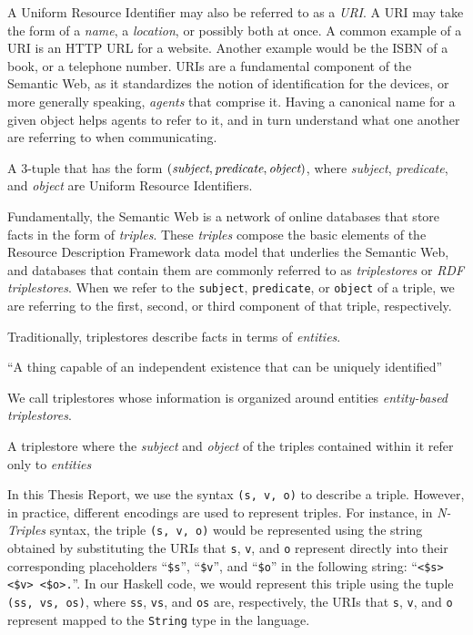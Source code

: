 \documentclass[../main.tex]{subfiles}
\begin{document}
A Uniform Resource Identifier may also be referred to as a {\em URI}.  A URI may take the form of a {\em name}, a {\em location}, or possibly both at once.
A common example of a URI is an HTTP URL for a website.  Another example would be the ISBN of a book, or a telephone number.
URIs are a fundamental component of the Semantic Web, as it standardizes the notion of identification for the devices, or more generally speaking, {\em agents}
that comprise it.  Having a canonical name for a given object helps agents to refer to it, and in turn understand what one another are referring to when communicating.

\begin{definition}[Triple]
	A 3-tuple that has the form $(\text{\em subject}, \text{\em predicate}, \text{\em object})$, where {\em subject}, {\em predicate}, and {\em object} are Uniform Resource Identifiers\cite{w3csemanticweb}.
\end{definition}

Fundamentally, the Semantic Web is a network of online databases that store facts in the form of {\em triples}.
These {\em triples} compose the basic elements of the Resource Description Framework data model that underlies the Semantic Web, and databases that contain them are commonly referred to as {\em triplestores} or {\em RDF triplestores}.  When we refer to the \texttt{subject}, \texttt{predicate}, or \texttt{object} of a triple, we are referring to the first, second, or third component of that triple, respectively.

Traditionally, triplestores describe facts in terms of {\em entities}.

\begin{definition}[Entity]
	``A thing capable of an independent existence that can be uniquely identified''\cite{kent2015era}
\end{definition}

We call triplestores whose information is organized around entities {\em entity-based triplestores}.

\begin{definition}
	A triplestore where the {\em subject} and {\em object} of the triples contained within it refer only to {\em entities}
\end{definition}

In this Thesis Report, we use the syntax \texttt{(s, v, o)} to describe a triple.  However, in practice, different encodings are used
to represent triples.  For instance, in {\em N-Triples} syntax\cite{w3cntriples}, the triple \texttt{(s, v, o)} would be represented using
the string obtained by substituting the URIs that \texttt{s}, \texttt{v}, and \texttt{o} represent directly into their corresponding placeholders ``\texttt{\$s}'', ``\texttt{\$v}'', and ``\texttt{\$o}'' in the following string:  ``\texttt{<\$s> <\$v> <\$o>.}''.  In our Haskell code, we would represent this triple using the tuple \texttt{(ss, vs, os)}, where \texttt{ss}, \texttt{vs}, and \texttt{os} are, respectively, the URIs that \texttt{s}, \texttt{v}, and \texttt{o} represent mapped to the \texttt{String} type in the language.
\end{document}
